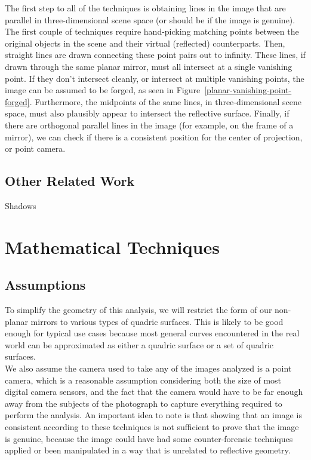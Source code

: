 \documentclass{article}
\begin{document}
The first step to all of the techniques is obtaining lines in the image that are parallel in three-dimensional scene space (or should be if the image is genuine). The first couple of techniques require hand-picking matching points between the original objects in the scene and their virtual (reflected) counterparts. Then, straight lines are drawn connecting these point pairs out to infinity. These lines, if drawn through the same planar mirror, must all intersect at a single vanishing point. If they don't intersect cleanly, or intersect at multiple vanishing points, the image can be assumed to be forged, as seen in Figure~\ref{planar-vanishing-point-forged}. Furthermore, the midpoints of the same lines, in three-dimensional scene space, must also plausibly appear to intersect the reflective surface. Finally, if there are orthogonal parallel lines in the image (for example, on the frame of a mirror), we can check if there is a consistent position for the center of projection, or point camera.
\cite{obrien12}


\subsection{Other Related Work}
Shadows

\section{Mathematical Techniques}
\subsection{Assumptions}
To simplify the geometry of this analysis, we will restrict the form of our non-planar mirrors to various types of quadric surfaces. This is likely to be good enough for typical use cases because most general curves encountered in the real world can be approximated as either a quadric surface or a set of quadric surfaces. \\
We also assume the camera used to take any of the images analyzed is a point camera, which is a reasonable assumption considering both the size of most digital camera sensors, and the fact that the camera would have to be far enough away from the subjects of the photograph to capture everything required to perform the analysis.
An important idea to note is that showing that an image is consistent according to these techniques is not sufficient to prove that the image is genuine, because the image could have had some counter-forensic techniques applied or been manipulated in a way that is unrelated to reflective geometry.
\end{document}
